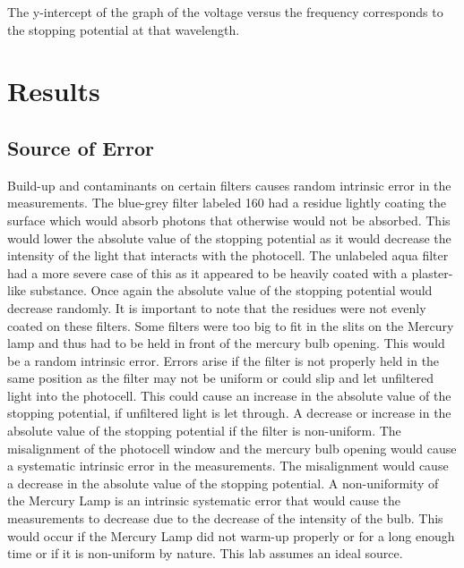 \documentclass[a4paper]{article}
\begin{document}

\qq The y-intercept of the graph of the voltage versus the
frequency corresponds to the stopping potential at that wavelength. 
 

\section{Results}


\subsection{Source of Error}

\qq Build-up and contaminants on certain filters causes random
intrinsic error in the measurements. The blue-grey filter labeled 160
had a residue lightly coating the surface which would absorb photons
that otherwise would not be absorbed. This would lower the absolute
value of the stopping potential as it would decrease the intensity of
the light that interacts with the photocell. The unlabeled aqua filter
had a more severe case of this as it appeared to be heavily coated
with a plaster-like substance. Once again the absolute value of the
stopping potential would decrease randomly. It is important to note
that the residues were not evenly coated on these filters. Some
filters were too big to fit in the slits on the Mercury lamp and thus
had to be held in front of the mercury bulb opening. This would be a
random intrinsic error. Errors arise if the filter is not properly
held in the same position as the filter may not be uniform or could
slip and let unfiltered light into the photocell. This could cause an
increase in the absolute value of the stopping potential, if
unfiltered light is let through. A decrease or increase in the
absolute value of the stopping potential if the filter is
non-uniform. The misalignment of the photocell window and the mercury
bulb opening would cause a systematic intrinsic error in the
measurements. The misalignment would cause a decrease in the absolute
value of the stopping potential. A non-uniformity of the Mercury Lamp
is an intrinsic systematic error that would cause the measurements to
decrease due to the decrease of the intensity of the bulb. This would
occur if the Mercury Lamp did not warm-up properly or for a long
enough time or if it is non-uniform by nature. This lab assumes an
ideal source.
\end{document}
